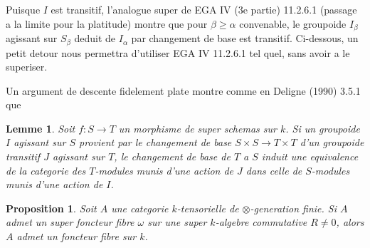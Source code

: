 \documentclass[11pt,a4paper]{article}
\theoremstyle{plain}
\newtheorem{lemma}[theorem]{Lemme}
\newtheorem{proposition}[theorem]{Proposition}
\theoremstyle{definition}
\begin{document}
Puisque $I$ est transitif, l'analogue super de EGA IV (3e partie) 11.2.6.1 (passage a la limite pour la platitude) montre que pour $\beta\geq\alpha$ convenable, le groupoide $I_\beta$ agissant sur $S_\beta$ deduit de $I_\alpha$ par changement de base est transitif. Ci-dessous, un petit detour nous permettra d'utiliser EGA IV 11.2.6.1 tel quel, sans avoir a le superiser.

Un argument de descente fidelement plate montre comme en Deligne (1990) 3.5.1 que

\begin{lemma}\label{4.4}
Soit $f:S\to T$ un morphisme de super schemas sur $k$. Si un groupoide $I$ agissant sur $S$ provient par le changement de base $S\times S\to T\times T$ d'un groupoide transitif $J$ agissant sur $T$, le changement de base de $T$ a $S$ induit une equivalence de la categorie des $T$-modules munis d'une action de $J$ dans celle de $S$-modules munis d'une action de $I$.
\end{lemma}

\begin{proposition}\label{4.5}
Soit $A$ une categorie $k$-tensorielle de $\otimes$-generation finie. Si $A$ admet un super foncteur fibre $\omega$ sur une super $k$-algebre commutative $R\neq0$, alors $A$ admet un foncteur fibre sur $k$.
\end{proposition}
\end{document}
